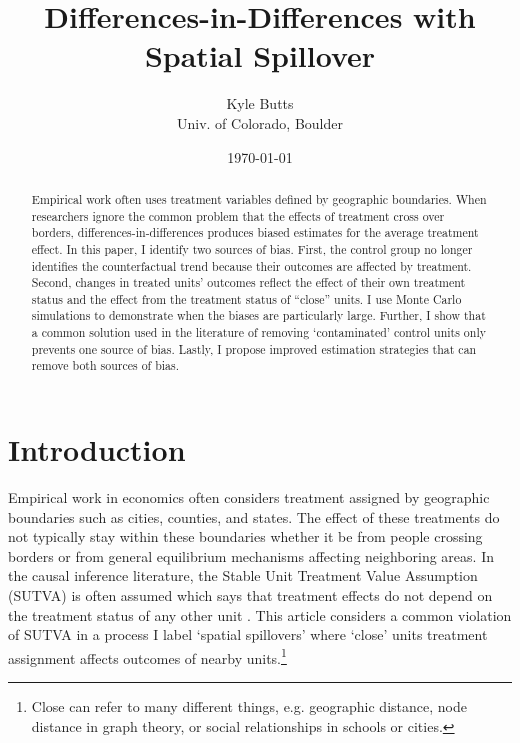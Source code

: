 \documentclass[11pt]{article}
\title{\color{teal} Differences-in-Differences with Spatial Spillover}
\author{\normalsize Kyle Butts\\{\footnotesize Univ. of Colorado, Boulder}}
\date{\footnotesize\today}
\begin{document}

   
    
    
\begin{titlepage}
    
    \maketitle
    
    \begin{abstract}
        Empirical work often uses treatment variables defined by geographic boundaries. When researchers ignore the common problem that the effects of treatment cross over borders, differences-in-differences produces biased estimates for the average treatment effect. In this paper, I identify two sources of bias. First, the control group no longer identifies the counterfactual trend because their outcomes are affected by treatment. Second, changes in treated units' outcomes reflect the effect of their own treatment status and the effect from the treatment status of ``close'' units. I use Monte Carlo simulations to demonstrate when the biases are particularly large. Further, I show that a common solution used in the literature of removing `contaminated' control units only prevents one source of bias. Lastly, I propose improved estimation strategies that can remove both sources of bias.  
    \end{abstract}
\end{titlepage}
    
\newpage 

\section{Introduction}
Empirical work in economics often considers treatment assigned by geographic boundaries such as cities, counties, and states. The effect of these treatments do not typically stay within these boundaries whether it be from people crossing borders or from general equilibrium mechanisms affecting neighboring areas. In the causal inference literature, the Stable Unit Treatment Value Assumption (SUTVA) is often assumed which says that treatment effects do not depend on the treatment status of any other unit \citep{Rubin_1980}. This article considers a common violation of SUTVA in a process I label `spatial spillovers' where `close' units treatment assignment affects outcomes of nearby units.\footnote{Close can refer to many different things, e.g. geographic distance, node distance in graph theory, or social relationships in schools or cities.} 
\end{document}
